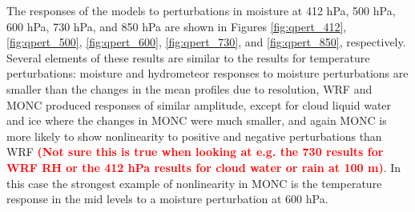 \documentclass[draft]{agujournal2019}
\newcommand{\todo}[1]{\textcolor{red}{\textbf{(#1)}}}
\begin{document}
The responses of the models to perturbations in moisture at 412 hPa, 500 hPa,
600 hPa, 730 hPa, and 850 hPa are shown in Figures \ref{fig:qpert_412},
\ref{fig:qpert_500}, \ref{fig:qpert_600}, \ref{fig:qpert_730}, and
\ref{fig:qpert_850}, respectively. Several elements of these results are similar
to the results for temperature perturbations: moisture and hydrometeor responses
to moisture perturbations are smaller than the changes in the mean profiles due
to resolution, WRF and MONC produced responses of similar amplitude, except for
cloud liquid water and ice where the changes in MONC were much smaller, and
again MONC is more likely to show nonlinearity to positive and negative
perturbations than WRF \todo{Not sure this is true when looking at e.g. the 730
results for WRF RH or the 412 hPa results for cloud water or rain at 100 m}. In
this case the strongest example of nonlinearity in MONC is the temperature
response in the mid levels to a moisture perturbation at 600 hPa.


\end{document}
